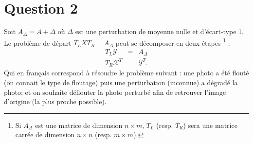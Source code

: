 \section{Question 2}
Soit $A_{\Delta} = A + \Delta$ où $\Delta$ est une perturbation de moyenne nulle et d'écart-type 1. Le problème de départ $T_L X T_R = A_{\Delta}$ peut se décomposer en deux étapes \footnote{Si $A_{\Delta}$
est une matrice de dimension $n \times m$, $T_L$ (resp. $T_R$) sera une matrice carrée de dimension $n \times n$ (resp. $m \times m$).} :
\begin{eqnarray}
  \label{eq_q2}
  T_L \mathcal{Y} &=& A_{\Delta}\\
  T_R \mathcal{X}^T &=& \mathcal{Y}^T.
\end{eqnarray}
Qui en français correspond à résoudre le problème suivant : une photo a été flouté (on connait le type de floutage) puis une perturbation (inconnue) a dégradé la photo; et on souhaite déflouter la photo perturbé afin de retrouver l'image d'origine (la plus proche possible).



